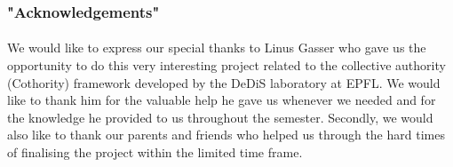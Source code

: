 \subsubsection*{"Acknowledgements"}

\paragraph{}
We would like to express our special thanks to Linus Gasser who gave us the opportunity to do this very interesting project related to the collective authority (Cothority) framework developed by the DeDiS laboratory at EPFL. We would like to thank him for the valuable help he gave us whenever we needed and for the knowledge he provided to us throughout the semester.
Secondly, we would also like to thank our parents and friends who helped us through the hard times of finalising the project within the limited time frame.
